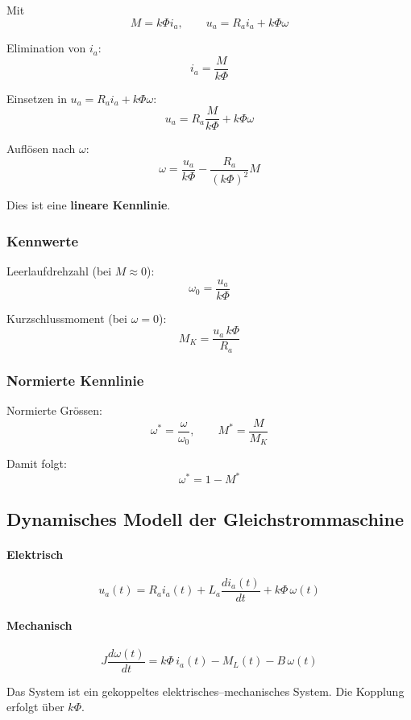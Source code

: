 Mit
\[
M=k\Phi i_a,
\qquad
u_a=R_a i_a+k\Phi\omega
\]

Elimination von $i_a$:
\[
i_a=\frac{M}{k\Phi}
\]

Einsetzen in $u_a=R_a i_a+k\Phi\omega$:
\[
u_a=R_a\frac{M}{k\Phi}+k\Phi\omega
\]

Auflösen nach $\omega$:
\[
\boxed{\omega=\frac{u_a}{k\Phi}-\frac{R_a}{(k\Phi)^2}M}
\]

Dies ist eine \textbf{lineare Kennlinie}.

\subsubsection{Kennwerte}

Leerlaufdrehzahl (bei $M\approx 0$):
\[
\boxed{\omega_0=\frac{u_a}{k\Phi}}
\]

Kurzschlussmoment (bei $\omega=0$):
\[
\boxed{M_K=\frac{u_a\,k\Phi}{R_a}}
\]

\subsubsection{Normierte Kennlinie}

Normierte Grössen:
\[
\boxed{\omega^*=\frac{\omega}{\omega_0}},
\qquad
\boxed{M^*=\frac{M}{M_K}}
\]

Damit folgt:
\[
\boxed{\omega^*=1-M^*}
\]


\subsection{Dynamisches Modell der Gleichstrommaschine}

\paragraph{Elektrisch}
\[
\boxed{u_a(t)=R_a i_a(t)+L_a\frac{di_a(t)}{dt}+k\Phi\,\omega(t)}
\]

\paragraph{Mechanisch}
\[
\boxed{J\frac{d\omega(t)}{dt}=k\Phi\,i_a(t)-M_L(t)-B\,\omega(t)}
\]

Das System ist ein gekoppeltes elektrisches--mechanisches System.
Die Kopplung erfolgt über $k\Phi$.

